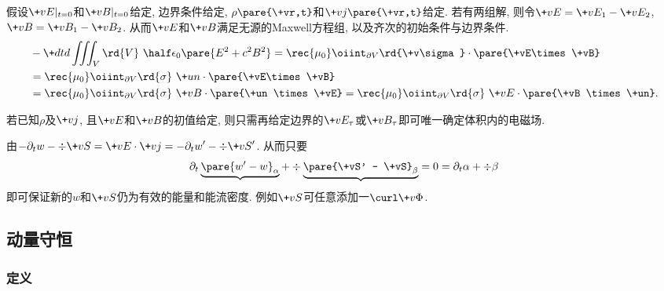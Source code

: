 \documentclass[hidelinks]{ctexart}
\begin{document}
假设$\+vE\vert_{t=0}$和$\+vB\vert_{t=0}$给定, 边界条件给定, $\rho\pare{\+vr,t}$和$\+vj\pare{\+vr,t}$给定. 若有两组解, 则令$\+vE = \+vE_1 - \+vE_2$, $\+vB = \+vB_1 - \+vB_2$. 从而$\+vE$和$\+vB$满足无源的Maxwell方程组, 以及齐次的初始条件与边界条件.
\begin{align*}
    & -\+dtd{} \iiint_V \rd{V}\ \half \epsilon_0 \pare{E^2 + c^2B^2} = \rec{\mu_0}\oiint_{\partial V}\rd{\+v\sigma}\cdot \pare{\+vE\times \+vB}\\
    &= \rec{\mu_0}\oiint_{\partial V}\rd{\sigma}\ \+un \cdot \pare{\+vE\times \+vB} \\
    &= \rec{\mu_0}\oiint_{\partial V}\rd{\sigma}\ \+vB \cdot \pare{\+un \times \+vE} = \rec{\mu_0}\oiint_{\partial V}\rd{\sigma}\ \+vE \cdot \pare{\+vB \times \+un}.
\end{align*}
\begin{theorem}
    若已知$\rho$及$\+vj$, 且$\+vE$和$\+vB$的初值给定, 则只需再给定边界的$\+vE_\tau$或$\+vB_\tau$即可唯一确定体积内的电磁场.
\end{theorem}


\label{ssub:w与s的不确定性}

由$\displaystyle -\partial_t w - \div \+vS = \+vE\cdot \+vj = -\partial_t w' - \div \+vS'$. 从而只要
\[ \partial_t \underbrace{\pare{w' - w}_\alpha} + \div \underbrace{\pare{\+vS' - \+vS}_\beta} = 0 = \partial_t \alpha + \div \beta \]
即可保证新的$w$和$\+vS$仍为有效的能量和能流密度. 例如$\+vS$可任意添加一$\curl \+v\Phi$.



\subsection{动量守恒} %
\label{sub:动量守恒}

\subsubsection{定义} %
\label{ssub:定义}
\end{document}
